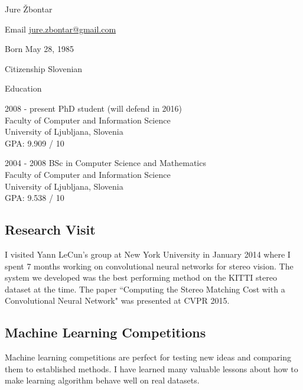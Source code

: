 \documentclass[12pt,a4paper]{article}
\begin{document}
\begin{cv}{Jure \v{Z}bontar}

\begin{cvlist}{}
\item[Email] \href{mailto:jure.zbontar@gmail.com}{jure.zbontar@gmail.com}

\item[Born] May 28, 1985
\item[Citizenship] Slovenian

\end{cvlist}

\begin{cvlist}{Education}
\item[2008 - present] PhD student (will defend in 2016) \\
Faculty of Computer and Information Science \\
University of Ljubljana, Slovenia \\
GPA: 9.909 / 10

\item[2004 - 2008] BSc in Computer Science and Mathematics \\
Faculty of Computer and Information Science \\
University of Ljubljana, Slovenia \\
GPA: 9.538 / 10

\end{cvlist}

\subsection*{Research Visit}
I visited Yann LeCun's group at New York University in January 2014
where I spent 7 months working on convolutional neural networks for
stereo vision. The system we developed was the best performing method on
the KITTI stereo dataset at the time. The paper ``Computing the Stereo
Matching Cost with a Convolutional Neural Network" was presented at
CVPR 2015.

\subsection*{Machine Learning Competitions}
Machine learning competitions are perfect for testing new ideas and
comparing them to established methods. I have learned many valuable
lessons about how to make learning algorithm behave well on real datasets.


\end{cv}
\end{document}
